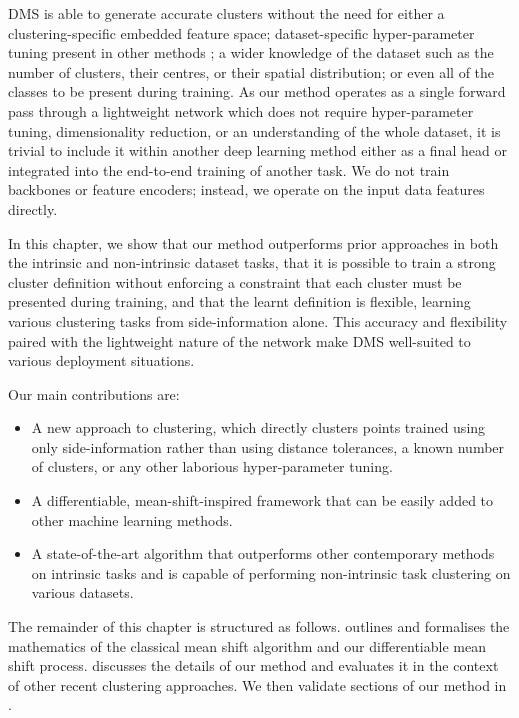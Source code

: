 \documentclass[../thesis.tex]{subfiles}
\begin{document}
DMS is able to generate accurate clusters without the need for either a clustering-specific embedded feature space; dataset-specific hyper-parameter tuning present in other methods \cite{Hsu2015, Liu2015, Ceccarelli2008, Li2018}; a  wider knowledge of the dataset such as the number of clusters, their centres, or their spatial distribution; or even all of the classes to be present during training.
As our method operates as a single forward pass through a lightweight network which does not require hyper-parameter tuning, dimensionality reduction, or an understanding of the whole dataset, it is trivial to include it within another deep learning method either as a final head or integrated into the end-to-end training of another task. We do not train backbones or feature encoders; instead, we operate on the input data features directly.

In this chapter, we show that our method outperforms prior
approaches in both the intrinsic and non-intrinsic dataset tasks, that it is possible to train a strong cluster definition without enforcing a constraint that each cluster must be presented during training, and that the learnt definition is flexible, learning various clustering tasks from side-information alone.
This accuracy and flexibility paired with the lightweight nature of the network make DMS well-suited to various deployment situations.

Our main contributions are:
\begin{itemize}
    \item A new approach to clustering, which directly clusters points trained using only side-information rather than using distance tolerances, a known number of clusters, or any other laborious hyper-parameter tuning.
    \item A differentiable, mean-shift-inspired framework that can be easily added to other machine learning methods.
    \item A state-of-the-art algorithm that outperforms other contemporary methods on intrinsic tasks and is capable of performing non-intrinsic task clustering on various datasets.
\end{itemize}

The remainder of this chapter is structured as follows. 
 outlines and formalises the mathematics of the classical mean shift algorithm and our differentiable mean shift process.
 discusses the details of our method and evaluates it in the context of other recent clustering approaches.
We then validate sections of our method in .
\end{document}
